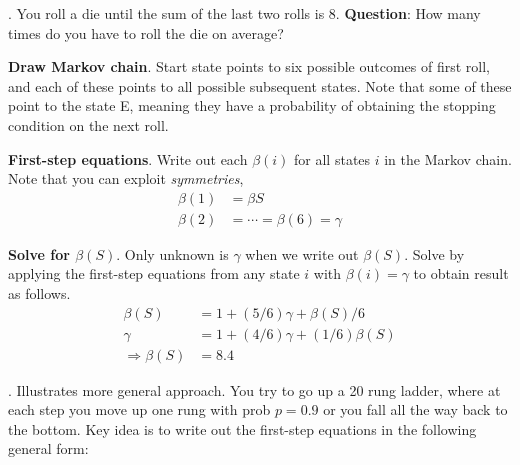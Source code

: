 \documentclass[12pt]{article}
\newcommand{\myspace}{\vspace{2\bigskipamount}}
\newcommand\p{\Needspace{12\baselineskip} \noindent}
\begin{document}
\myspace
\p {}. You roll a die until the sum of the last two rolls is 8. \textbf{Question}: How many times do you have to roll the die on average?
\begin{compactitem}
	\item \textbf{Draw Markov chain}. Start state points to six possible outcomes of first roll, and each of these points to all possible subsequent states. Note that some of these point to the state E, meaning they have a probability of obtaining the stopping condition on the next roll. 
	
	\item \textbf{First-step equations}. Write out each $\beta(i)$ for all states $i$ in the Markov chain. Note that you can exploit \textit{symmetries},
	\begin{align}
		\beta(1) &= \beta{S} \\
		\beta(2) &= \cdots = \beta(6) = \gamma
	\end{align}
	
	\item \textbf{Solve for $\beta(S)$}. Only unknown is $\gamma$ when we write out $\beta(S)$. Solve by applying the first-step equations from any state $i$ with $\beta(i) = \gamma$ to obtain result as follows.
	\begin{align}
		\beta(S) &= 1 + (5/6) \gamma + \beta(S)/6 \\
		\gamma &= 1 + (4/6)\gamma + (1/6)\beta(S)\\
		\Rightarrow \beta(S) &= 8.4 
	\end{align}
\end{compactitem}


\myspace
\p {}. Illustrates more general approach. You try to go up a 20 rung ladder, where at each step you move up one rung with prob $p = 0.9$ or you fall all the way back to the bottom. Key idea is to write out the first-step equations in the following general form:
\end{document}
